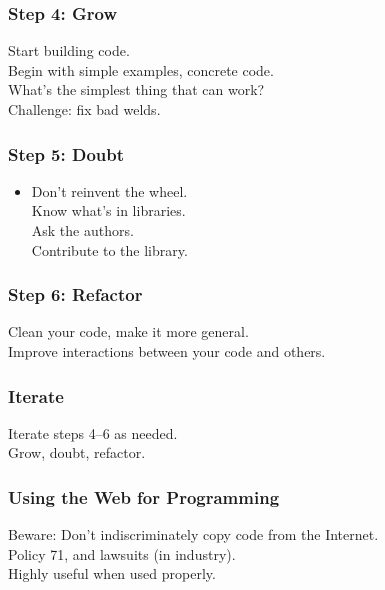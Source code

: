 \begin{frame}
\frametitle{Step 4: Grow}
\begin{changemargin}{1cm}
\Large
Start building code.\\[1em]
Begin with simple examples, concrete code.\\[1em]
What's the simplest thing that can work?\\[1em]
Challenge: fix bad welds.
\end{changemargin}
\end{frame}

\begin{frame}
\frametitle{Step 5: Doubt}

\Large
\begin{changemargin}{1cm}
\begin{itemize}
\item Don't reinvent the wheel.\\
 Know what's in libraries.\\
 Ask the authors.\\
 Contribute to the library.
\end{itemize}
\end{changemargin}

\end{frame}

\begin{frame}
\frametitle{Step 6: Refactor}

\Large
\begin{changemargin}{1cm}
Clean your code, make it more general.\\[1em]
Improve interactions between your code and others.
\end{changemargin}

\end{frame}

\begin{frame}
\frametitle{Iterate}

\begin{changemargin}{1cm}
\Large
Iterate steps 4--6 as needed.\\
Grow, doubt, refactor.
\end{changemargin}
\end{frame}

\begin{frame}
\frametitle{Using the Web for Programming}

\begin{changemargin}{1cm}
Beware: Don't indiscriminately copy code from the Internet.\\
Policy 71, and lawsuits (in industry).\\[1em]

Highly useful when used properly.
\end{changemargin}

\end{frame}

